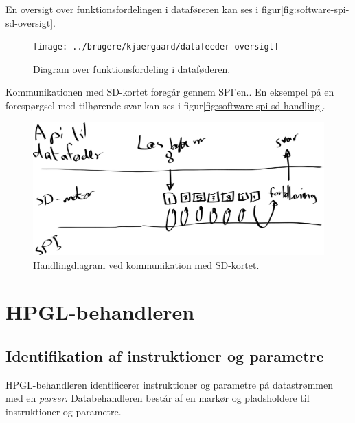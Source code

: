 En oversigt over funktionsfordelingen i
dataføreren kan ses i
figur\vref{fig:software-spi-sd-oversigt}.

\begin{figure}[htbp]
  \centering
  \texttt{[image: ../brugere/kjaergaard/datafeeder-oversigt]}
  \caption{Diagram over funktionsfordeling i dataføderen.}
  \label{fig:software-spi-sd-oversigt}
\end{figure}

Kommunikationen med SD-kortet foregår gennem SPI'en.. En eksempel på en forespørgsel med tilhørende svar
kan ses i figur\vref{fig:software-spi-sd-handling}.

\begin{figure}[htbp]
  \centering
  \includegraphics[width=\textwidth]{../brugere/kjaergaard/datafeeder-handling}
  \caption{Handlingdiagram ved kommunikation med SD-kortet.}
  \label{fig:software-spi-sd-handling}
\end{figure}


\section{HPGL-behandleren}



\subsection{Identifikation af instruktioner og parametre}


HPGL-behandleren identificerer instruktioner og parametre på
datastrømmen med en \textit{parser}. Databehandleren består af en
markør og pladsholdere til instruktioner og parametre.

